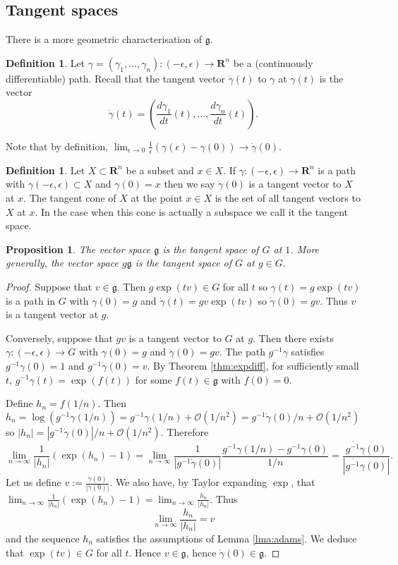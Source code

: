 \documentclass[12pt]{article}
\newcommand{\RR}{\mathbf{R}}
\newtheorem{prp}[thm]{Proposition}
\theoremstyle{definition}
\newtheorem{dfn}[thm]{Definition}
\theoremstyle{check}
\theoremstyle{remark}
\theoremstyle{TheoremNum}
\begin{document}
\subsection{Tangent spaces}

There is a more geometric characterisation of $\mathfrak{g}$.

\begin{dfn}
Let $\gamma=(\gamma_1,\ldots,\gamma_n)\colon(-\epsilon,\epsilon)\to\RR^n$ be a (continuously differentiable) path. Recall that the tangent vector $\dot{\gamma}(t)$ to $\gamma$ at $\gamma(t)$ is the vector
\[\dot{\gamma}(t)=\left(\frac{d\gamma_1}{dt}(t),\ldots,\frac{d\gamma_n}{dt}(t)\right).\]
\end{dfn}
Note that by definition, $\lim_{\epsilon\to 0}\frac{1}{\epsilon}(\gamma(\epsilon)-\gamma(0))\to\dot{\gamma}(0)$.

\begin{dfn}
Let $X\subset\RR^n$ be a subset and $x\in X$. If $\gamma\colon(-\epsilon,\epsilon)\to\RR^n$ is a path with $\gamma(-\epsilon,\epsilon)\subset X$ and $\gamma(0)=x$ then we say $\dot{\gamma}(0)$ is a tangent vector to $X$ at $x$. The tangent cone of $X$ at the point $x\in X$ is the set of all tangent vectors to $X$ at $x$. In the case when this cone is actually a subspace we call it the tangent space.
\end{dfn}

\begin{prp}
The vector space $\mathfrak{g}$ is the tangent space of $G$ at $1$. More generally, the vector space $g\mathfrak{g}$ is the tangent space of $G$ at $g\in G$.
\end{prp}
\begin{proof}
Suppose that $v\in\mathfrak{g}$. Then $g\exp(tv)\in G$ for all $t$ so $\gamma(t)=g\exp(tv)$ is a path in $G$ with $\gamma(0)=g$ and $\dot{\gamma}(t)=gv\exp(tv)$ so $\dot{\gamma}(0)=gv$. Thus $v$ is a tangent vector at $g$.

Conversely, suppose that $gv$ is a tangent vector to $G$ at $g$. Then there exists $\gamma\colon(-\epsilon,\epsilon)\to G$ with $\gamma(0)=g$ and $\dot{\gamma}(0)=gv$. The path $g^{-1}\gamma$ satisfies $g^{-1}\gamma(0)=1$ and $g^{-1}\dot{\gamma}(0)=v$. By Theorem \ref{thm:expdiff}, for sufficiently small $t$, $g^{-1}\gamma(t)=\exp(f(t))$ for some $f(t)\in\mathfrak{g}$ with $f(0)=0$.

Define $h_n=f(1/n)$. Then $h_n=\log(g^{-1}\gamma(1/n))=g^{-1}\gamma(1/n)+\mathcal{O}(1/n^2)=g^{-1}\dot{\gamma}(0)/n+\mathcal{O}(1/n^2)$ so $|h_n|=|g^{-1}\dot{\gamma}(0)|/n+\mathcal{O}(1/n^2)$. Therefore
\[\lim_{n\to\infty}\frac{1}{|h_n|}(\exp(h_n)-1)=\lim_{n\to\infty}\frac{1}{|g^{-1}\dot{\gamma}(0)|}\frac{g^{-1}\gamma(1/n)-g^{-1}\gamma(0)}{1/n}=\frac{\dot{g^{-1}\gamma}(0)}{|\dot{g^{-1}\gamma}(0)|}.\]
Let us define $v:=\frac{\dot{\gamma}(0)}{|\dot{\gamma}(0)|}$. We also have, by Taylor expanding $\exp$, that $\lim_{n\to\infty}\frac{1}{|h_n|}(\exp(h_n)-1)=\lim_{n\to\infty}\frac{h_n}{|h_n|}$. Thus
\[\lim_{n\to\infty}\frac{h_n}{|h_n|}=v\]
and the sequence $h_n$ satisfies the assumptions of Lemma \ref{lma:adams}. We deduce that $\exp(tv)\in G$ for all $t$. Hence $v\in\mathfrak{g}$, hence $\dot{\gamma}(0)\in\mathfrak{g}$.
\end{proof}
\end{document}

